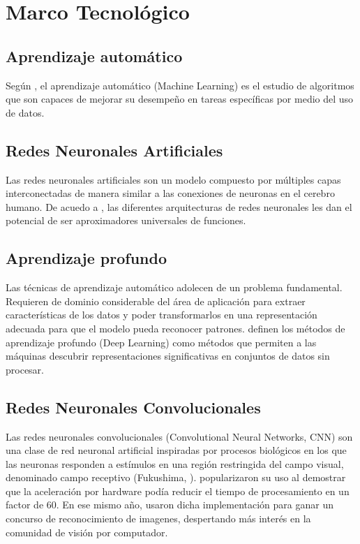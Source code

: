 \section{Marco Tecnológico}

\subsection{Aprendizaje automático}

Según \cite{mitchell1997machine}, el aprendizaje automático (Machine Learning) 
es el estudio de algoritmos que son capaces de mejorar su desempeño en tareas 
específicas por medio del uso de datos.

\subsection{Redes Neuronales Artificiales}

Las redes neuronales artificiales son un modelo compuesto por múltiples capas 
interconectadas de manera similar a las conexiones de neuronas en el cerebro 
humano. De acuedo a \cite{braspenning1995artificial}, las diferentes 
arquitecturas de redes neuronales les dan el potencial de ser aproximadores 
universales de funciones. %

\subsection{Aprendizaje profundo}

Las técnicas de aprendizaje automático adolecen de un problema fundamental. 
Requieren de dominio considerable del área de aplicación para extraer 
características de los datos y poder transformarlos en una representación 
adecuada para que el modelo pueda reconocer patrones. \cite{LeCun2015} definen
los métodos de aprendizaje profundo (Deep Learning) como métodos que permiten a 
las máquinas descubrir representaciones significativas en conjuntos de datos 
sin procesar.


\subsection{Redes Neuronales Convolucionales}

Las redes neuronales convolucionales (Convolutional Neural Networks, CNN) son 
una clase de red neuronal artificial inspiradas por procesos biológicos en los 
que las neuronas responden a estímulos en una región restringida del campo 
visual, denominado campo receptivo (Fukushima, \citeyear{Fukushima1980}). 
\cite{Ciresan2011FlexibleHP} popularizaron su uso al demostrar que la 
aceleración por hardware podía reducir el tiempo de procesamiento en un factor 
de 60. En ese mismo año, usaron dicha implementación para ganar un concurso de 
reconocimiento de imagenes, despertando más interés en la comunidad de visión 
por computador.


